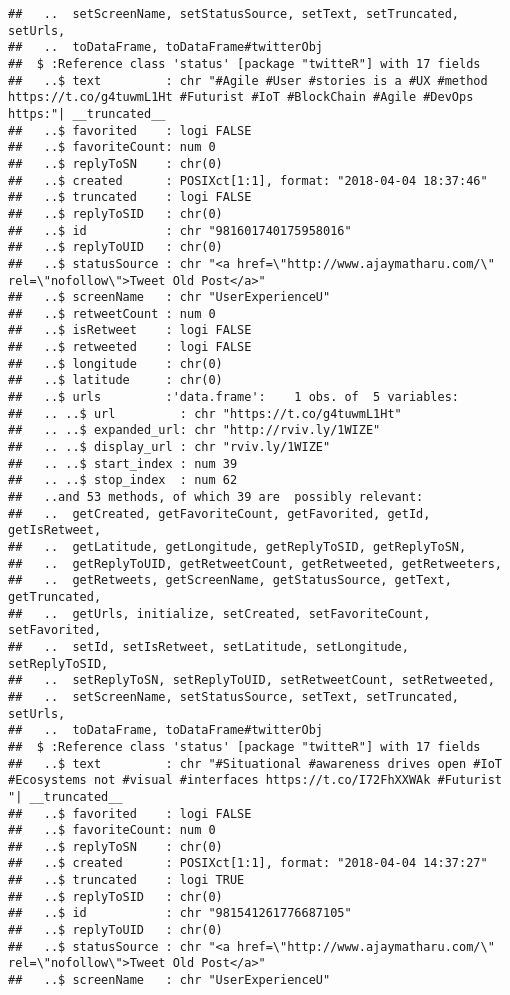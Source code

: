 \documentclass[]{article}
\begin{document}
\begin{verbatim}
##   ..  setScreenName, setStatusSource, setText, setTruncated, setUrls,
##   ..  toDataFrame, toDataFrame#twitterObj
##  $ :Reference class 'status' [package "twitteR"] with 17 fields
##   ..$ text         : chr "#Agile #User #stories is a #UX #method https://t.co/g4tuwmL1Ht #Futurist #IoT #BlockChain #Agile #DevOps https:"| __truncated__
##   ..$ favorited    : logi FALSE
##   ..$ favoriteCount: num 0
##   ..$ replyToSN    : chr(0) 
##   ..$ created      : POSIXct[1:1], format: "2018-04-04 18:37:46"
##   ..$ truncated    : logi FALSE
##   ..$ replyToSID   : chr(0) 
##   ..$ id           : chr "981601740175958016"
##   ..$ replyToUID   : chr(0) 
##   ..$ statusSource : chr "<a href=\"http://www.ajaymatharu.com/\" rel=\"nofollow\">Tweet Old Post</a>"
##   ..$ screenName   : chr "UserExperienceU"
##   ..$ retweetCount : num 0
##   ..$ isRetweet    : logi FALSE
##   ..$ retweeted    : logi FALSE
##   ..$ longitude    : chr(0) 
##   ..$ latitude     : chr(0) 
##   ..$ urls         :'data.frame':    1 obs. of  5 variables:
##   .. ..$ url         : chr "https://t.co/g4tuwmL1Ht"
##   .. ..$ expanded_url: chr "http://rviv.ly/1WIZE"
##   .. ..$ display_url : chr "rviv.ly/1WIZE"
##   .. ..$ start_index : num 39
##   .. ..$ stop_index  : num 62
##   ..and 53 methods, of which 39 are  possibly relevant:
##   ..  getCreated, getFavoriteCount, getFavorited, getId, getIsRetweet,
##   ..  getLatitude, getLongitude, getReplyToSID, getReplyToSN,
##   ..  getReplyToUID, getRetweetCount, getRetweeted, getRetweeters,
##   ..  getRetweets, getScreenName, getStatusSource, getText, getTruncated,
##   ..  getUrls, initialize, setCreated, setFavoriteCount, setFavorited,
##   ..  setId, setIsRetweet, setLatitude, setLongitude, setReplyToSID,
##   ..  setReplyToSN, setReplyToUID, setRetweetCount, setRetweeted,
##   ..  setScreenName, setStatusSource, setText, setTruncated, setUrls,
##   ..  toDataFrame, toDataFrame#twitterObj
##  $ :Reference class 'status' [package "twitteR"] with 17 fields
##   ..$ text         : chr "#Situational #awareness drives open #IoT #Ecosystems not #visual #interfaces https://t.co/I72FhXXWAk #Futurist "| __truncated__
##   ..$ favorited    : logi FALSE
##   ..$ favoriteCount: num 0
##   ..$ replyToSN    : chr(0) 
##   ..$ created      : POSIXct[1:1], format: "2018-04-04 14:37:27"
##   ..$ truncated    : logi TRUE
##   ..$ replyToSID   : chr(0) 
##   ..$ id           : chr "981541261776687105"
##   ..$ replyToUID   : chr(0) 
##   ..$ statusSource : chr "<a href=\"http://www.ajaymatharu.com/\" rel=\"nofollow\">Tweet Old Post</a>"
##   ..$ screenName   : chr "UserExperienceU"

\end{verbatim}
\end{document}
